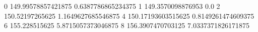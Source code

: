 0 149.99578857421875 0.6387786865234375
1 149.3570098876953 0.0
2 150.52197265625 1.1649627685546875
4 150.17193603515625 0.8149261474609375
6 155.228515625 5.8715057373046875
8 156.3907470703125 7.0337371826171875
